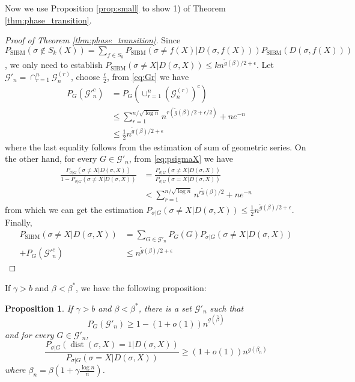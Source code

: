 \documentclass[journal]{IEEEtran}
\newtheorem{proposition}{Proposition}
\newcommand{\cG}{\mathcal{G}}
\DeclareMathOperator{\SIBM}{SIBM}
\DeclareMathOperator{\dist}{dist}
\begin{document}
Now we use Proposition \ref{prop:small} to show 1) of Theorem \ref{thm:phase_transition}.
\begin{proof}[Proof of Theorem \ref{thm:phase_transition}]
Since $P_{\SIBM}(\sigma \not \in S_k(X)) = \sum_{f\in S_k} P_{\SIBM}(\sigma \neq f(X) | D(\sigma, f(X))) P_{\SIBM}(D(\sigma, f(X)))$,
we only need to establish $P_{\SIBM}(\sigma \neq X | D(\sigma, X)) \leq k n^{\tilde{g}(\beta)/2 + \epsilon}$.
Let $\cG'_n = \cap_{r=1}^n \cG_n^{(r)}$, choose $\frac{\epsilon}{2}$, from \eqref{eq:Gr} we have
\begin{align*}
P_G(\cG'^c_n) &= P_G(\cup_{r=1}^n (\cG_n^{(r)})^c) \\
&\leq \sum_{r=1}^{n/\sqrt{\log n } } n^{r(\tilde{g}(\beta)/2 + \epsilon/2)}  + n e^{-n} \\
& \leq \frac{1}{2} n^{\tilde{g}(\beta)/2 + \epsilon}
\end{align*}
where the last equality follows from the estimation of sum of geometric series.
On the other hand, for every $G \in \cG'_n$, from \eqref{eq:psigmaX}
we have
\begin{align*}
\frac{P_{\sigma | G}(\sigma \neq X | D(\sigma, X))}{1-P_{\sigma | G}(\sigma \neq X | D(\sigma, X))} &= \frac{P_{\sigma | G}(\sigma \neq X | D(\sigma, X))}{P_{\sigma|G}(\sigma=X | D(\sigma, X))} \\
&< \sum_{r=1}^{n/\sqrt{\log n }}  n^{r\tilde{g}(\beta)/2} + n e^{-n}
\end{align*}
from which we can get the estimation $P_{\sigma | G}(\sigma \neq X | D(\sigma, X))\leq \frac{1}{2}n^{\tilde{g}(\beta)/2 + \epsilon}$.
Finally, 
\begin{align*}
P_{\SIBM}(\sigma \neq X|D(\sigma, X)) &= \sum_{G\in \cG'_n} P_G(G)P_{\sigma |G}(\sigma \neq X | D(\sigma, X)) \\
+ P_G(\cG'^c_n)
& \leq n^{\tilde{g}(\beta)/2 + \epsilon}
\end{align*}

\end{proof}
If $\gamma > b$ and $\beta < \beta^*$, we have the following proposition:
\begin{proposition}\label{prop:large2}
	If $\gamma > b$ and $\beta < \beta^*$, there is a set $\cG'_n$ such that
	\begin{equation}
	P_G(\cG'_n) \geq 1 - (1+o(1))n^{g(\bar{\beta})}
	\end{equation}
	and for every $G \in \cG'_n$,
	\begin{equation}\label{eq:diff1g}
	\frac{P_{\sigma|G}(\dist(\sigma, X)=1 | D(\sigma, X))}
	{P_{\sigma|G}(\sigma=X | D(\sigma, X))} \geq (1+o(1))n^{g(\beta_n)}
	\end{equation}
	where $\beta_n = \beta(1+\gamma\frac{\log n}{n})$.
\end{proposition}
\end{document}
